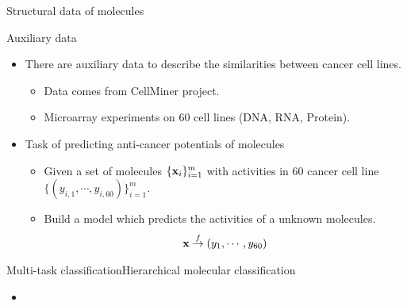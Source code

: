 \documentclass[first=dgreen,second=purple,logo=yellowexc]{aaltoslides}
\begin{document}
{\begin{frame}{Structural data of molecules}
\begin{itemize}
	\end{itemize}
\end{frame}

\begin{frame}{Auxiliary data}
	\begin{itemize}
		\item There are auxiliary data to describe the similarities between cancer cell lines.
		\begin{itemize}
			\footnotesize
			\item Data comes from CellMiner project.
			\item Microarray experiments on $60$ cell lines (DNA, RNA, Protein).
		\end{itemize}
		\item Task of predicting anti-cancer potentials of molecules
		\begin{itemize}
			\footnotesize
			\item Given a set of molecules $\{\mathbf {x}_i\}_{i=1}^m$ with activities in $60$ cancer cell line $\{(y_{i,1},\cdots,y_{i,60})\}_{i=1}^m$.
			\item Build a model which predicts the activities of a unknown molecules.
			\begin{align*}
				\mathbf {x} \overset{f}{\rightarrow} (y_{1},\cdots,y_{60})
			\end{align*}
		\end{itemize}
	\end{itemize}
\end{frame}


\begin{frame}{Multi-task classification}{Hierarchical molecular classification}
	\begin{itemize}
		\item 
	\end{itemize}
\end{frame}

}
\end{document}
